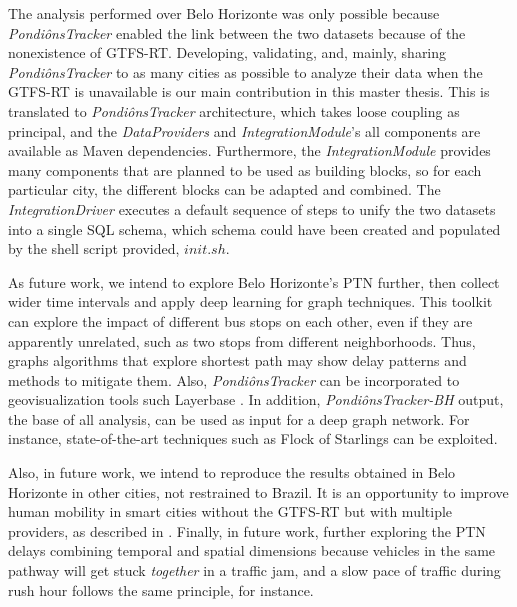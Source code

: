 The analysis performed over Belo Horizonte was only possible because \textit{PondiônsTracker} enabled
the link between the two datasets because of the nonexistence of GTFS-RT. 
Developing, validating, and, mainly, sharing \textit{PondiônsTracker}
to as many cities as possible to analyze their data when the GTFS-RT is unavailable is our main
contribution in this master thesis. This is translated to \textit{PondiônsTracker} architecture, which
takes loose coupling as principal, and the \textit{DataProviders} and \textit{IntegrationModule}'s all components are available as Maven dependencies. 
Furthermore, the \textit{IntegrationModule} provides many components that are planned to be used as 
building blocks, so for each particular city, the different blocks can be adapted and combined. 
The \textit{IntegrationDriver} executes a default sequence of steps to unify the two datasets into a 
single SQL schema, which schema could have been created and populated by the shell script provided, $init.sh$.

As future work, we intend to explore Belo Horizonte's PTN further, then collect wider time intervals
and apply deep learning for graph techniques. 
This toolkit can explore the impact of different bus stops on each other, even if
they are apparently unrelated, such as two stops from different neighborhoods.
Thus, graphs algorithms that explore shortest path may show delay patterns and methods to mitigate them.
Also, \textit{PondiônsTracker} can be incorporated to geovisualization tools such Layerbase \cite{layerbase}. 
In addition, \textit{PondiônsTracker-BH} output, the base of all analysis, can be used as input for a deep graph network. For instance, state-of-the-art 
techniques such as Flock of Starlings can be exploited.

Also, in future work, we intend to reproduce the results obtained in Belo Horizonte in other cities, not
restrained to Brazil. It is an opportunity to improve human mobility in smart cities without the GTFS-RT but with multiple providers, as described in . Finally, in future work, further exploring the PTN delays combining temporal and spatial dimensions because vehicles in 
the same pathway will get stuck{ \em together} in a traffic jam, and a slow pace of traffic during rush hour follows the same principle, for instance.
